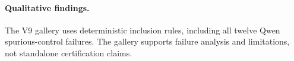 \paragraph{Qualitative findings.}
The V9 gallery uses deterministic inclusion rules, including all twelve Qwen spurious-control failures. The gallery supports failure analysis and limitations, not standalone certification claims.
